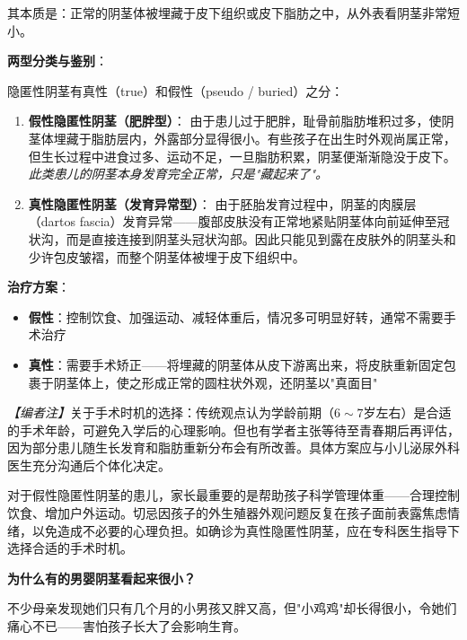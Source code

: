 \documentclass[12pt,a4paper,twoside]{ctexbook}
\begin{document}
其本质是：正常的阴茎体被埋藏于皮下组织或皮下脂肪之中，从外表看阴茎非常短小。

\vspace{0.5em}
\noindent\textbf{两型分类与鉴别}：

隐匿性阴茎有真性（true）和假性（pseudo / buried）之分：

\begin{enumerate}
	\item \textbf{假性隐匿性阴茎（肥胖型）}：
	由于患儿过于肥胖，耻骨前脂肪堆积过多，使阴茎体埋藏于脂肪层内，外露部分显得很小。有些孩子在出生时外观尚属正常，但生长过程中进食过多、运动不足，一旦脂肪积累，阴茎便渐渐隐没于皮下。\textit{此类患儿的阴茎本身发育完全正常，只是"藏起来了"。}

	\item \textbf{真性隐匿性阴茎（发育异常型）}：
	由于胚胎发育过程中，阴茎的肉膜层（dartos fascia）发育异常——腹部皮肤没有正常地紧贴阴茎体向前延伸至冠状沟，而是直接连接到阴茎头冠状沟部。因此只能见到露在皮肤外的阴茎头和少许包皮皱褶，而整个阴茎体被埋于皮下组织中。
\end{enumerate}

\noindent\textbf{治疗方案}：

\begin{itemize}
	\item \textbf{假性}：控制饮食、加强运动、减轻体重后，情况多可明显好转，通常不需要手术治疗
	\item \textbf{真性}：需要手术矫正——将埋藏的阴茎体从皮下游离出来，将皮肤重新固定包裹于阴茎体上，使之形成正常的圆柱状外观，还阴茎以"真面目"
\end{itemize}

\noindent\textit{【编者注】}关于手术时机的选择：传统观点认为学龄前期（$6\sim7$岁左右）是合适的手术年龄，可避免入学后的心理影响。但也有学者主张等待至青春期后再评估，因为部分患儿随生长发育和脂肪重新分布会有所改善。具体方案应与小儿泌尿外科医生充分沟通后个体化决定。

\begin{tcolorbox}[colback=pink!5!white,colframe=red!50!black,title=贴心小叮咛]
对于假性隐匿性阴茎的患儿，家长最重要的是帮助孩子科学管理体重——合理控制饮食、增加户外运动。切忌因孩子的外生殖器外观问题反复在孩子面前表露焦虑情绪，以免造成不必要的心理负担。如确诊为真性隐匿性阴茎，应在专科医生指导下选择合适的手术时机。
\end{tcolorbox}

\vspace{0.8em}
\noindent\textbf{为什么有的男婴阴茎看起来很小？}

不少母亲发现她们只有几个月的小男孩又胖又高，但"小鸡鸡"却长得很小，令她们痛心不已——害怕孩子长大了会影响生育。
\end{document}
